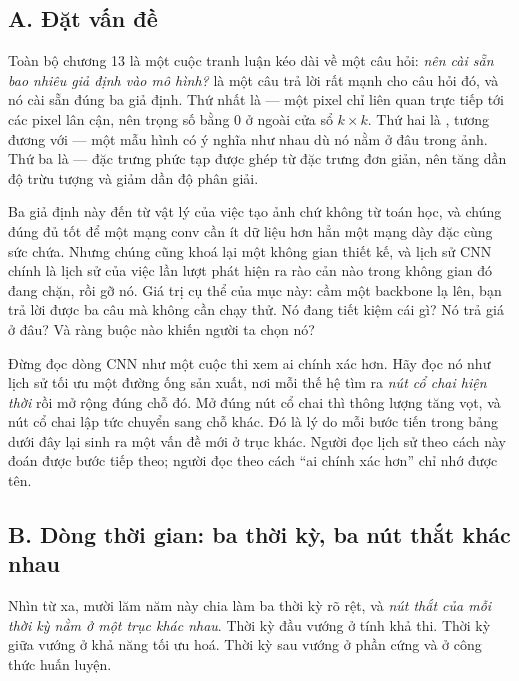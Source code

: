 \documentclass[../../../deep_learning.tex]{subfiles}
\begin{document}
\subsection{A. Đặt vấn đề}
Toàn bộ chương 13 là một cuộc tranh luận kéo dài về một câu hỏi: \emph{nên cài sẵn bao nhiêu giả định vào mô hình?}  là một câu trả lời rất mạnh cho câu hỏi đó, và nó cài sẵn đúng ba giả định. Thứ nhất là  --- một pixel chỉ liên quan trực tiếp tới các pixel lân cận, nên trọng số bằng \(0\) ở ngoài cửa sổ \(k\times k\). Thứ hai là , tương đương với  --- một mẫu hình có ý nghĩa như nhau dù nó nằm ở đâu trong ảnh. Thứ ba là  --- đặc trưng phức tạp được ghép từ đặc trưng đơn giản, nên tăng dần độ trừu tượng và giảm dần độ phân giải.

Ba giả định này đến từ vật lý của việc tạo ảnh chứ không từ toán học, và chúng đúng đủ tốt để một mạng conv cần ít dữ liệu hơn hẳn một mạng dày đặc cùng sức chứa. Nhưng chúng cũng khoá lại một không gian thiết kế, và lịch sử CNN chính là lịch sử của việc lần lượt phát hiện ra rào cản nào trong không gian đó đang chặn, rồi gỡ nó. Giá trị cụ thể của mục này: cầm một backbone lạ lên, bạn trả lời được ba câu mà không cần chạy thử. Nó đang tiết kiệm cái gì? Nó trả giá ở đâu? Và ràng buộc nào khiến người ta chọn nó?

\begin{trucgiac}
Đừng đọc dòng CNN như một cuộc thi xem ai chính xác hơn. Hãy đọc nó như lịch sử tối ưu một đường ống sản xuất, nơi mỗi thế hệ tìm ra \emph{nút cổ chai hiện thời} rồi mở rộng đúng chỗ đó. Mở đúng nút cổ chai thì thông lượng tăng vọt, và nút cổ chai lập tức chuyển sang chỗ khác. Đó là lý do mỗi bước tiến trong bảng dưới đây lại sinh ra một vấn đề mới ở trục khác. Người đọc lịch sử theo cách này đoán được bước tiếp theo; người đọc theo cách ``ai chính xác hơn'' chỉ nhớ được tên.
\end{trucgiac}

\subsection{B. Dòng thời gian: ba thời kỳ, ba nút thắt khác nhau}
Nhìn từ xa, mười lăm năm này chia làm ba thời kỳ rõ rệt, và \emph{nút thắt của mỗi thời kỳ nằm ở một trục khác nhau}. Thời kỳ đầu vướng ở tính khả thi. Thời kỳ giữa vướng ở khả năng tối ưu hoá. Thời kỳ sau vướng ở phần cứng và ở công thức huấn luyện.
\end{document}
